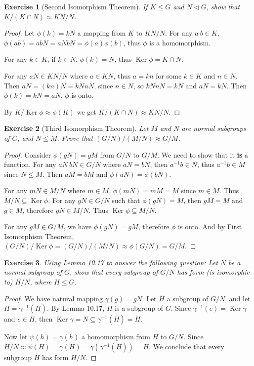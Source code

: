 \documentclass[14pt]{extarticle}
\newtheorem{exercise}{Exercise}[section]
\newcommand{\inv}[1]{#1^{-1}}
\newcommand{\normalin}{\triangleleft}
\newcommand{\1}{\{ e \}}
\DeclareMathOperator{\Ker}{Ker}
\begin{document}
\begin{exercise}[Second Isomorphism Theorem]
  If $K \leq G$ and $N \normalin G$, show that $K/(K \cap N) \approx KN/N$.
\end{exercise}
\begin{proof}
  Let $\phi(k) = kN$ a mapping from $K$ to $KN/N$.
  For any $a \ b \in K$, $\phi(ab) = abN = aNbN = \phi(a)\phi(b)$,
  thus $\phi$ is a homomorphism.

  For any $k \in K$, if $k \in N$, $\phi(k) = N$, thus $\Ker \phi = K \cap N$.

  For any $aN \in KN/N$ where $a \in KN$, thus $a = kn$ for some $k \in K$ and $n \in N$.
  Then $aN = (kn)N = kNnN$, since $n \in N$, so $kNnN = kN$ and $aN = kN$.
  Then $\phi(k) = kN = aN$, $\phi$ is onto.

  By $K / \Ker \phi \approx \phi(K)$ we get $K / (K \cap N) \approx KN/N$.
\end{proof}

\begin{exercise}[Third Isomorphism Theorem]
  Let $M$ and $N$ are normal subgroups of $G$, and $N \leq M$.
  Prove that $(G/N)/(M/N) \approx G/M$.
\end{exercise}
\begin{proof}
  Consider $\phi(gN) = gM$ from $G/N$ to $G/M$.
  We need to show that it \textbf{is} a function.
  For any $aN \ bN \in G/N$ where $aN = bN$,
  then $\inv{a}b \in N$, thus $\inv{a}b \in M$ since $N \leq M$.
  Then $aM = bM$ and $\phi(aN) = \phi(bN)$.

  For any $mN \in M/N$ where $m \in M$, $\phi(mN) = mM = M$ since $m \in M$.
  Thus $M/N \subseteq \Ker \phi$. 
  For any $gN \in G/N$ such that $\phi(gN) = M$, then $gM = M$ and $g \in M$,
  therefore $gN \in M/N$. Thus $\Ker \phi \subseteq M/N$.

  For any $gM \in G/M$, we have $\phi(gN) = gM$, therefore $\phi$ is onto.
  And by First Isomorphism Theorem, $(G/N) / \Ker \phi = (G/N)/(M/N) \approx \phi(G/N) = G/M$.
\end{proof}

\setcounter{exercise}{58}
\begin{exercise}
  Using \textnormal{Lemma 10.17} to answer the following question:
  Let $N$ be a normal subgroup of $G$, 
  show that every subgroup of $G/N$ 
  has form (is isomorphic to)
  $H/N$, where $H \leq G$.
\end{exercise}
\begin{proof}
  We have natural mapping $\gamma(g) = gN$.
  Let $\overline{H}$ a subgroup of $G/N$,
  and let $H = \inv{\gamma}(\overline{H})$.
  By Lemma 10.17, $H$ is a subgroup of $G$.
  Since $\inv{\gamma}(e) = \Ker \gamma$
  and $e \in \overline{H}$,
  then $\Ker \gamma = N \subseteq \inv{\gamma}(\overline{H}) = H$.

  Now let $\psi(h) = \gamma(h)$ a homomorphism from $H$ to $G/N$.
  Since $H/N \approx \psi(H) = \gamma(H) = \gamma(\inv{\gamma}(\overline{H})) = \overline{H}$.
  We conclude that every subgroup $\overline{H}$ has form $H/N$.
\end{proof}
\end{document}
